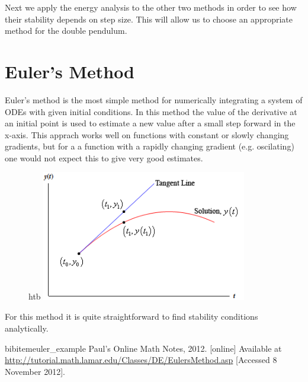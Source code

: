 \documentclass[a4paper,11pt,twoside]{article}
\begin{document}
Next we apply the energy analysis to the other two methods in order to 
see how their stability depends on step size. This will allow us to choose 
an appropriate method for the double pendulum.

\section{Euler's Method}
Euler's method is the most simple method for numerically integrating a 
system of ODEs with given initial conditions. In this method the value 
of the derivative at an initial point is used to estimate a new value 
after a small step forward in the x-axis. This apprach works well on
functions with constant or slowly changing gradients, but for a 
a function with a rapidly changing gradient (e.g. oscilating) one would 
not expect this to give very good estimates.

\begin{figure}{htb}
	\centering
	\includegraphics[width=0.8\textwidth]{euler_example.png}
	\caption{}
	\label{fig:euler_example}
\end{figure}

For this method it is quite straightforward to find stability conditions 
analytically. 
 
\begin{thebibliography}{20}

bibitem{euler_example}
Paul's Online Math Notes, 2012. [online] Available at \url{http://tutorial.math.lamar.edu/Classes/DE/EulersMethod.asp}
[Accessed 8 November 2012].

\end{thebibliography}
\end{document}
